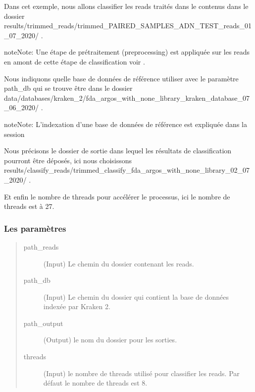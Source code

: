 \documentclass[letterpaper,10pt,french]{sphinxmanual}
\begin{document}
Dans cet exemple, nous allons classifier les reads traités dans le contenus dans le dossier results/trimmed\_reads/trimmed\_PAIRED\_SAMPLES\_ADN\_TEST\_reads\_01\_07\_2020/ .

\begin{sphinxadmonition}{note}{Note:}
Une étape de prétraitement (pre\sphinxhyphen{}processing) est appliquée sur les reads en amont de cette étape de classification voir {\hyperref[\detokenize{tutorial:pre-processing}]{}}.
\end{sphinxadmonition}

Nous indiquons quelle base de données de référence utiliser avec le paramètre \sphinxhyphen{}path\_db qui se trouve être dans le dossier data/databases/kraken\_2/fda\_argos\_with\_none\_library\_kraken\_database\_07\_06\_2020/ .

\begin{sphinxadmonition}{note}{Note:}
L’indexation d’une base de données de référence est expliquée dans la session {\hyperref[\detokenize{tutorial:indexation-kraken2}]{}}
\end{sphinxadmonition}

Nous précisons le dossier de sortie dans lequel les résultats de classification pourront être déposés, ici nous choisissons results/classify\_reads/trimmed\_classify\_fda\_argos\_with\_none\_library\_02\_07\_2020/ .

Et enfin le nombre de threads pour accélérer le processus, ici le nombre de threads est à 27.


\subsubsection{Les paramètres}
\label{\detokenize{tutorial:id29}}\begin{quote}\begin{description}
\item[{\sphinxhyphen{}path\_reads}] \leavevmode
(Input) Le chemin du dossier contenant les reads.

\item[{\sphinxhyphen{}path\_db}] \leavevmode
(Input) Le chemin du dossier qui contient la base de données indexée par Kraken 2.

\item[{\sphinxhyphen{}path\_output}] \leavevmode
(Output) le nom du dossier pour les sorties.

\item[{\sphinxhyphen{}threads}] \leavevmode
(Input) le nombre de threads utilisé pour classifier les reads. Par défaut le nombre de threads est 8.

\end{description}\end{quote}
\end{document}
